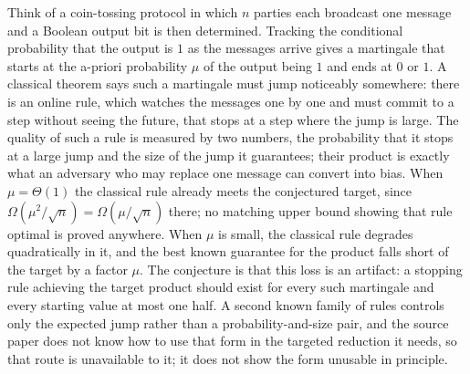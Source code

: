 \documentclass{aicr-conjecture}
\begin{document}

\vspace{0.4em}

\begin{informalconjecture}
Think of a coin-tossing protocol in which $n$ parties each broadcast one
message and a Boolean output bit is then determined. Tracking the
conditional probability that the output is $1$ as the messages arrive
gives a martingale that starts at the a-priori probability $\mu$ of the
output being $1$ and ends at $0$ or $1$. A classical theorem says such a
martingale must jump noticeably somewhere: there is an online rule,
which watches the messages one by one and must commit to a step without
seeing the future, that stops at a step where the jump is large. The
quality of such a rule is measured by two numbers, the probability that
it stops at a large jump and the size of the jump it guarantees; their
product is exactly what an adversary who may replace one message can
convert into bias. When $\mu = \Theta(1)$ the classical rule already
meets the conjectured target, since $\Omega(\mu^{2}/\sqrt{n}) =
\Omega(\mu/\sqrt{n})$ there; no matching upper bound showing that rule
optimal is proved anywhere. When $\mu$ is small, the classical rule
degrades quadratically in it, and the best known guarantee for the
product falls short of the target by a factor $\mu$. The conjecture is
that this loss is an artifact: a stopping rule achieving the target
product should exist for every such martingale and every starting value
at most one half. A second known family of rules controls only the
expected jump rather than a probability-and-size pair, and the source
paper does not know how to use that form in the targeted reduction it
needs, so that route is unavailable to it; it does not show the form
unusable in principle.
\end{informalconjecture}
\end{document}
